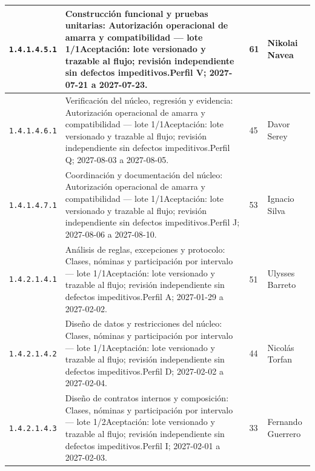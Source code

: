 \begin{longtable}{L{29mm}L{80mm}R{12mm}L{28mm}}
\texttt{1.\allowbreak{}4.\allowbreak{}1.\allowbreak{}4.\allowbreak{}5.\allowbreak{}1} & Construcción funcional y pruebas unitarias: Autorización operacional de amarra y compatibilidad — lote 1/1\newline Aceptación: lote versionado y trazable al flujo; revisión independiente sin defectos impeditivos.\newline Perfil V; 2027-07-21 a 2027-07-23. & 61 & Nikolai Navea\\\hline
\texttt{1.\allowbreak{}4.\allowbreak{}1.\allowbreak{}4.\allowbreak{}6.\allowbreak{}1} & Verificación del núcleo, regresión y evidencia: Autorización operacional de amarra y compatibilidad — lote 1/1\newline Aceptación: lote versionado y trazable al flujo; revisión independiente sin defectos impeditivos.\newline Perfil Q; 2027-08-03 a 2027-08-05. & 45 & Davor Serey\\\hline
\texttt{1.\allowbreak{}4.\allowbreak{}1.\allowbreak{}4.\allowbreak{}7.\allowbreak{}1} & Coordinación y documentación del núcleo: Autorización operacional de amarra y compatibilidad — lote 1/1\newline Aceptación: lote versionado y trazable al flujo; revisión independiente sin defectos impeditivos.\newline Perfil J; 2027-08-06 a 2027-08-10. & 53 & Ignacio Silva\\\hline
\texttt{1.\allowbreak{}4.\allowbreak{}2.\allowbreak{}1.\allowbreak{}4.\allowbreak{}1} & Análisis de reglas, excepciones y protocolo: Clases, nóminas y participación por intervalo — lote 1/1\newline Aceptación: lote versionado y trazable al flujo; revisión independiente sin defectos impeditivos.\newline Perfil A; 2027-01-29 a 2027-02-02. & 51 & Ulysses Barreto\\\hline
\texttt{1.\allowbreak{}4.\allowbreak{}2.\allowbreak{}1.\allowbreak{}4.\allowbreak{}2} & Diseño de datos y restricciones del núcleo: Clases, nóminas y participación por intervalo — lote 1/1\newline Aceptación: lote versionado y trazable al flujo; revisión independiente sin defectos impeditivos.\newline Perfil D; 2027-02-02 a 2027-02-04. & 44 & Nicolás Torfan\\\hline
\texttt{1.\allowbreak{}4.\allowbreak{}2.\allowbreak{}1.\allowbreak{}4.\allowbreak{}3} & Diseño de contratos internos y composición: Clases, nóminas y participación por intervalo — lote 1/2\newline Aceptación: lote versionado y trazable al flujo; revisión independiente sin defectos impeditivos.\newline Perfil I; 2027-02-01 a 2027-02-03. & 33 & Fernando Guerrero\\\hline

\end{longtable}
